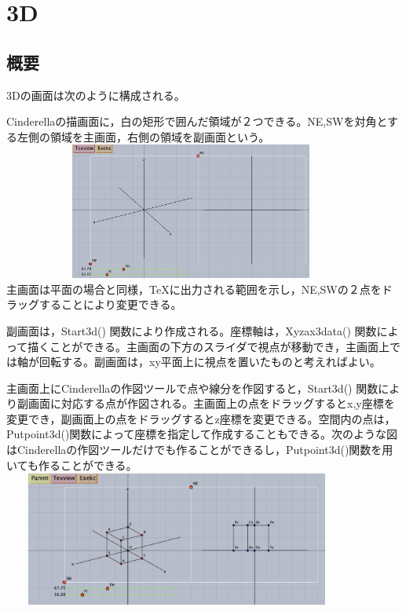 \documentclass[papersize,a4paper,12pt,uplatex]{jsarticle}
\begin{document}
\section{\ketcindy 3D}
\subsection{概要}
\ketcindy 3Dの画面は次のように構成される。

Cinderellaの描画面に，白の矩形で囲んだ領域が２つできる。NE,SWを対角とする左側の領域を主画面，右側の領域を副画面という。\\

　　　　　　\includegraphics[bb=0 0 1776 998 , width=8cm]{Fig3d/3dstart.png}\\

主画面は平面の場合と同様，TeXに出力される範囲を示し，NE,SWの２点をドラッグすることにより変更できる。

副画面は，Start3d() 関数により作成される。座標軸は，Xyzax3data() 関数によって描くことができる。主画面の下方のスライダで視点が移動でき，主画面上では軸が回転する。副画面は，xy平面上に視点を置いたものと考えればよい。

主画面上にCinderellaの作図ツールで点や線分を作図すると，Start3d() 関数により副画面に対応する点が作図される。主画面上の点をドラッグするとx,y座標を変更でき，副画面上の点をドラッグするとz座標を変更できる。空間内の点は，Putpoint3d()関数によって座標を指定して作成することもできる。次のような図はCinderellaの作図ツールだけでも作ることができるし，Putpoint3d()関数を用いても作ることができる。\\

　　\includegraphics[bb=0 0 1892 840 , width=10cm]{Fig3d/3dscreen.png}\\
\end{document}
